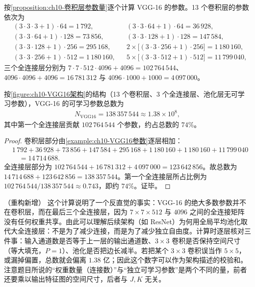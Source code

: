 \documentclass[../../main.tex]{subfiles}
\begin{document}
\begin{example}\label{example:ch10-VGG16参数}
按\cref{proposition:ch10-卷积层参数量}逐个计算 VGG-16 的参数。13 个卷积层的参数依次为
\begin{align*}
  &(3\cdot3\cdot3+1)\cdot64=1\,792, &&(3\cdot3\cdot64+1)\cdot64=36\,928,\\
  &(3\cdot3\cdot64+1)\cdot128=73\,856, &&(3\cdot3\cdot128+1)\cdot128=147\,584,\\
  &(3\cdot3\cdot128+1)\cdot256=295\,168, &&2\times\bigl[(3\cdot3\cdot256+1)\cdot256\bigr]=1\,180\,160,\\
  &(3\cdot3\cdot256+1)\cdot512=1\,180\,160, &&5\times\bigl[(3\cdot3\cdot512+1)\cdot512\bigr]=11\,799\,040,
\end{align*}
三个全连接层分别为 $7\cdot7\cdot512\cdot4096+4096=102\,764\,544$、$4096\cdot4096+4096=16\,781\,312$ 与 $4096\cdot1000+1000=4\,097\,000$。
\end{example}

\begin{proposition}\label{proposition:ch10-VGG16参数量}
按\cref{figure:ch10-VGG16架构}的结构（13 个卷积层、3 个全连接层、池化层无可学习参数），VGG-16 的可学习参数总数为
\begin{align}
  N_{\mathrm{VGG16}}=138\,357\,544\approx1.38\times10^{8},
  \label{align:ch10-VGG16参数量}
\end{align}
其中第一个全连接层贡献 $102\,764\,544$ 个参数，约占总数的 $74\%$。
\end{proposition}
\begin{proof}
卷积层部分由\cref{example:ch10-VGG16参数}逐层相加：
\begin{align*}
  &1\,792+36\,928+73\,856+147\,584+295\,168+1\,180\,160+1\,180\,160+11\,799\,040\\
  &\quad=14\,714\,688 .
\end{align*}
全连接层部分为 $102\,764\,544+16\,781\,312+4\,097\,000=123\,642\,856$。故总数为 $14\,714\,688+123\,642\,856=138\,357\,544$。第一个全连接层所占比例为 $102\,764\,544/138\,357\,544\approx0.743$，即约 $74\%$。证毕。
\end{proof}

\begin{remark}（重构新增）
这个计算说明了一个反直觉的事实：VGG-16 的绝大多数参数并不在卷积层，而在最后三个全连接层，因为 $7\times7\times512$ 与 $4096$ 之间的全连接矩阵没有任何权重共享。由此可以理解后续架构（如 ResNet）为何用全局平均池化取代大全连接层：不是为了减少连接，而是为了减少独立自由度。计算时逐层核对三件事：输入通道数是否等于上一层的输出通道数、$3\times3$ 卷积是否保持空间尺寸（等大填充，$P=1$）、池化是否把边长减半。若把某个 $3\times3$ 卷积误当作 $5\times5$，或漏掉偏置，总数就会偏离 $1.38$ 亿；因此这个数字可以作为架构描述的校验和。注意题目所说的“权重数量（连接数）”与“独立可学习参数”是两个不同的量，前者还要乘以输出特征图的空间尺寸，后者与 $J,K$ 无关。
\end{remark}
\end{document}

